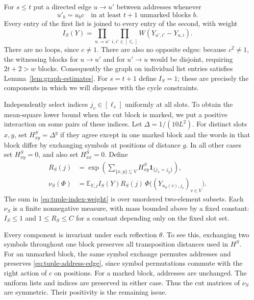 For $s\le t$ put a directed edge $u\to u'$ between addresses whenever
\begin{equation}\label{eq:tuple-address-edge}
 u'_b=u_bc\quad\text{in at least }t+1\text{ unmarked blocks }b.
\end{equation}
Every entry of the first list is joined to every entry of the second,
with weight
\[
 I_S(Y)=\prod_{u\to u'}\prod_{i,i'\in[\ell_s]}
         W(Y_{u',i'}-Y_{u,i}).
\]
There are no loops, since $c\ne1$.  There are also no opposite edges:
because $c^2\ne1$, the witnessing blocks for $u\to u'$ and for
$u'\to u$ would be disjoint, requiring $2t+2>w$ blocks.  Consequently
the graph on individual list entries satisfies Lemma~\ref{lem:graph-estimates}.
For $s=t+1$ define $I_S=1$; these are precisely the components in which
we will dispense with the cycle constraints.

Independently select indices $j_v\in[\ell_s]$ uniformly at all slots.
To obtain the mean-square lower bound when the cut block is marked,
we put a positive interaction on some pairs of these indices.  Let
$\Delta=1/(10L^2)$.  For distinct slots $x,y$, set $H^S_{xy}=\Delta^g$
if they agree except in one marked block and the words in that block
differ by exchanging symbols at positions of distance $g$.  In all other
cases set $H^S_{xy}=0$, and also set $H^S_{xx}=0$.  Define
\begin{align}
 R_S(j)&=\exp\left(\sum_{\{x,y\}\subseteq V}
                      H^S_{xy}\mathbf1_{\{j_x=j_y\}}\right),
 \label{eq:tuple-index-weight}\\
 \nu_S(\Phi)&=\mathbb E_{Y,j}
       I_S(Y)R_S(j)\,
       \Phi\bigl((Y_{u_S(v),j_v})_{v\in V}\bigr).
 \label{eq:tuple-component}
\end{align}
The sum in \eqref{eq:tuple-index-weight} is over unordered two-element
subsets.  Each $\nu_S$ is a finite nonnegative measure, with mass bounded
above by a fixed constant: $I_S\le1$ and $1\le R_S\le C$ for a constant
depending only on the fixed slot set.

Every component is invariant under each reflection $\theta$.  To see
this, exchanging two symbols throughout one block preserves all
transposition distances used in $H^S$.  For an unmarked block, the same
symbol exchange permutes addresses and preserves
\eqref{eq:tuple-address-edge}, since symbol permutations commute with
the right action of $c$ on positions.  For a marked block, addresses are
unchanged.  The uniform lists and indices are preserved in either case.
Thus the cut matrices of $\nu_S$ are symmetric.  Their positivity is
the remaining issue.

